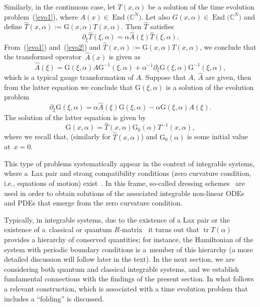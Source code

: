 \documentclass[10pt,a4paper]{amsart}
\numberwithin{equation}{section}
\theoremstyle{definition}
\DeclareMathOperator{\EEnd}{End}%
\def\mathcal#1{#1}%
\begin{document}
Similarly, in the continuous case, let $T(x,\alpha)$ be a solution of the time evolution problem~(\ref{evo1}), where $A(x) \in \EEnd\bigl({\mathbb C}^{\mathcal N}\bigr)$. Let also $G(x, \alpha)\in \EEnd\bigl({\mathbb C}^{\mathcal N}\bigr)$ and define
$\hat T(x, \alpha) := {\mathrm G}(x, \alpha) T(x, \alpha)$. Then $ \hat T$ satisfies
\begin{equation}
\partial_{\xi} \hat T(\xi, \alpha)= \alpha \hat A(\xi) \hat T(\xi, \alpha). \label{evo2}
\end{equation}
From~(\ref{evo1}) and~(\ref{evo2}) and $\hat T(x, \alpha) := {\mathrm G}(x, \alpha) T(x, \alpha)$, we conclude that the transformed operator~$\hat A(x) $ is given as \begin{equation*}
\hat A(\xi) = {\mathrm G}(\xi, \alpha)A{\mathrm G}^{-1} (\xi, \alpha)+\alpha^{-1}\partial_{\xi} {\mathrm G}(\xi, \alpha){\mathrm G}^{-1}(\xi, \alpha), \nonumber
\end{equation*}
which is a {typical gauge transformation of $A$.}
Suppose that $A$, $\hat A$ are given, then from the latter equation we conclude that
${\mathrm G}(\xi,\alpha)$ is a solution of the evolution problem
\begin{equation}
\partial_{\xi} {\mathrm G}(\xi, \alpha) = \alpha\hat A(\xi) {\mathrm G}(\xi, \alpha) - \alpha {\mathrm G}(\xi, \alpha) A(\xi).\label{gaugeA}
\end{equation}
The solution of the latter equation is given by
\[
{\mathrm G}(x, \alpha) = \hat T(x, \alpha) {\mathrm G}_0(\alpha)T^{-1}(x, \alpha),
\]
 where we recall that,  (similarly for $\hat T(x, \alpha)$) and ${\mathrm G}_0(\alpha)$ is some initial value at~${x =0}$.

This type of problems systematically appear in the context of integrable systems, where a~Lax pair and strong compatibility conditions (zero curvature condition, i.e., equations of motion) exist~\cite{AKNS, FT, Lax}. In this frame, so-called dressing schemes~\cite{DS, MS, ZS} are used in order to obtain solutions of the associated integrable non-linear ODEs and PDEs that emerge from the zero curvature condition.

Typically, in integrable systems, due to the existence of a Lax pair or the existence of a~classical or quantum $R$-matrix~\cite{FT, FadTakRes} it turns out that $\operatorname{tr} T(\alpha)$ provides a hierarchy of conserved quantities; for instance, the Hamiltonian of the system with periodic boundary conditions is a~member of this hierarchy (a more detailed discussion will follow later in the text). In the next section, we are considering both quantum and classical integrable systems, and we establish fundamental connections with the findings of the present section. In what follows a relevant construction, which is associated with a time evolution problem that includes a ``folding'' is discussed.
\end{document}
